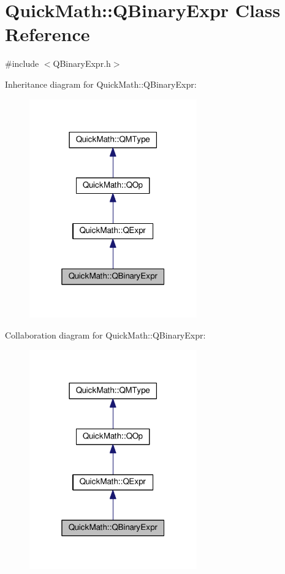 \hypertarget{classQuickMath_1_1QBinaryExpr}{}\section{Quick\+Math\+:\+:Q\+Binary\+Expr Class Reference}
\label{classQuickMath_1_1QBinaryExpr}


{\ttfamily \#include $<$Q\+Binary\+Expr.\+h$>$}



Inheritance diagram for Quick\+Math\+:\+:Q\+Binary\+Expr\+:
\nopagebreak
\begin{figure}[H]
\begin{center}
\leavevmode
\includegraphics[width=205pt]{classQuickMath_1_1QBinaryExpr__inherit__graph}
\end{center}
\end{figure}


Collaboration diagram for Quick\+Math\+:\+:Q\+Binary\+Expr\+:
\nopagebreak
\begin{figure}[H]
\begin{center}
\leavevmode
\includegraphics[width=205pt]{classQuickMath_1_1QBinaryExpr__coll__graph}
\end{center}
\end{figure}

